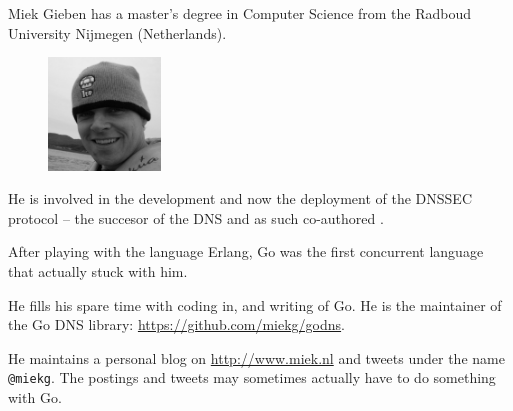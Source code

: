 Miek Gieben has a master's degree in Computer Science from the Radboud University Nijmegen (Netherlands).
\begin{figure}
  \begin{center}
  \includegraphics[width=3cm]{fig/avatar-miekg-300x300}
  \end{center}
\end{figure}
He is involved in the development and now the deployment of the DNSSEC protocol --
the succesor of the DNS and as such co-authored \cite{RFC4641}.

After playing with the language Erlang, Go was the first concurrent language
that actually stuck with him.

He fills his spare time with coding in, and writing of Go. He is the maintainer
of the Go DNS library: \url{https://github.com/miekg/godns}.

He maintains a personal blog on \url{http://www.miek.nl} and tweets
under the name \texttt{@miekg}. The postings and tweets may sometimes 
actually have to do something with Go.
